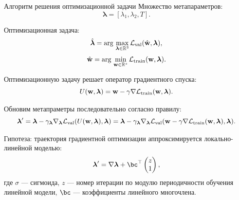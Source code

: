 \documentclass[10pt, aspectratio=169]{beamer}
\begin{document}
\begin{frame}{Алгоритм решения оптимизационной задачи}
Множество метапараметров:
\vspace{-0.2 cm}
$$\boldsymbol{\lambda} = [\lambda_1, \lambda_2, T].$$

Оптимизационная задача:
\vspace{-0.2 cm}
$$\hat{\boldsymbol{\lambda}} = \arg\,\max\limits_{\boldsymbol{\lambda} \in \mathbb{R}^3} \mathcal{L}_\text{val}(\hat{\mathbf{w}}, \boldsymbol{\lambda}),$$
$$\hat{\mathbf{w}} = \arg\,\min\limits_{\mathbf{w} \in \mathbb{R}^s} \mathcal{L}_\text{train}(\mathbf{w}, \boldsymbol{\lambda}).$$

Оптимизационную задачу решает оператор градиентного спуска:
\vspace{-0.2 cm}
$$U(\mathbf{w}, \boldsymbol{\lambda}) = \mathbf{w} - \gamma\nabla\mathcal{L}_\text{train}(\mathbf{w}, \boldsymbol{\lambda}).$$

Обновим метапраметры последовательно согласно правилу:
\vspace{-0.2 cm}
$$\boldsymbol{\lambda}^\prime = \boldsymbol{\lambda} - \gamma_{\boldsymbol{\lambda}}\nabla_{\boldsymbol{\lambda}}\mathcal{L}_\text{val}(U(\mathbf{w}, \boldsymbol{\lambda}), \boldsymbol{\lambda}) = \boldsymbol{\lambda} - \gamma_{\boldsymbol{\lambda}}\nabla_{\boldsymbol{\lambda}}\mathcal{L}_\text{val}(\mathbf{w} - \gamma\nabla\mathcal{L}_\text{train}(\mathbf{w}, \boldsymbol{\lambda}), \boldsymbol{\lambda}).$$

{\color{red}Гипотеза}: траектория градиентной оптимизации аппроксимируется локально-линейной моделью:
\vspace{-0.2 cm}
$$\boldsymbol{\lambda}^\prime = 
    \nabla \boldsymbol{\lambda} + \bc^{\top}\begin{pmatrix}z\\1\end{pmatrix},$$
где $\sigma$ --- сигмоида, $z$ --- номер итерации по модулю периодичности обучения линейной модели, $\bc$ --- коэффициенты линейного многочлена.


\end{frame}
\end{document}
